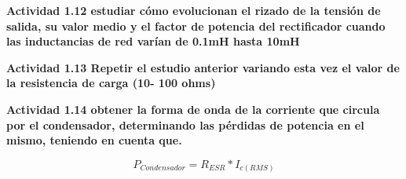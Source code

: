 \documentclass[letterpaper]{article}
\begin{document}
 \begin{large}

\textbf{Actividad 1.12 estudiar cómo evolucionan el rizado de la tensión de
salida, su valor medio y el factor de potencia del rectificador cuando
las inductancias de red varían de 0.1mH hasta 10mH }\end{large}
 \begin{large}

\textbf{Actividad 1.13 Repetir el estudio anterior variando esta vez el valor
de la resistencia de carga (10- 100 ohms)} \end{large}
 \begin{large}

\textbf{Actividad 1.14 obtener la forma de onda de la corriente que circula
por el condensador, determinando las pérdidas de potencia en el mismo,
teniendo en cuenta que.}\end{large}
 \begin{large}

\[
P_{Condensador}=R_{ESR}*I_{c(RMS)}
\]\end{large}
\end{document}
